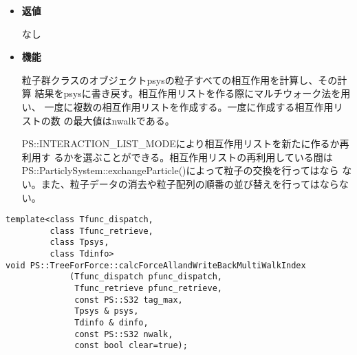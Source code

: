 \begin{itemize}
\item {\bf 返値}

なし

\item {\bf 機能}

粒子群クラスのオブジェクトpsysの粒子すべての相互作用を計算し、その計算
結果をpsysに書き戻す。相互作用リストを作る際にマルチウォーク法を用い、
一度に複数の相互作用リストを作成する。一度に作成する相互作用リストの数
の最大値はnwalkである。

PS::INTERACTION\_LIST\_MODEにより相互作用リストを新たに作るか再利用す
るかを選ぶことができる。相互作用リストの再利用している間は
PS::ParticlySystem::exchangeParticle()によって粒子の交換を行ってはなら
ない。また、粒子データの消去や粒子配列の順番の並び替えを行ってはならな
い。

\end{itemize}

\begin{screen}
\begin{verbatim}
template<class Tfunc_dispatch,
         class Tfunc_retrieve,
         class Tpsys,
         class Tdinfo>
void PS::TreeForForce::calcForceAllandWriteBackMultiWalkIndex
             (Tfunc_dispatch pfunc_dispatch,
              Tfunc_retrieve pfunc_retrieve,
              const PS::S32 tag_max,
              Tpsys & psys,
              Tdinfo & dinfo,
              const PS::S32 nwalk,
              const bool clear=true);
\end{verbatim}
\end{screen}

